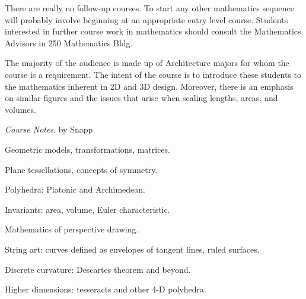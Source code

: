 \documentclass{osucourse}
\begin{document}
\CatalogDescription
\PrerequisitesAndExclusions

\begin{FollowupCourses}
There are really no follow-up courses. To start any other mathematics sequence will probably involve beginning at an appropriate entry level course. Students interested in further course work in mathematics should consult the Mathematics Advisors in 250 Mathematics Bldg.
\end{FollowupCourses}

\begin{Purpose}
The majority of the audience is made up of Architecture majors for whom the course is a requirement. The intent of the course is to introduce these students to the mathematics inherent in 2D and 3D design. Moreover, there is an emphasis on similar figures and the issues that arise when scaling lengths, areas, and volumes.
\end{Purpose}

\begin{Text}
\emph{Course Notes}, by Snapp
\end{Text}

\begin{TopicsList}
\item Geometric models, transformations, matrices.
\item Plane tessellations, concepts of symmetry.
\item Polyhedra: Platonic and Archimedean.
\item Invariants: area, volume, Euler characteristic.
\item Mathematics of perspective drawing.
\item String art: curves defined as envelopes of tangent lines, ruled surfaces.
\item Discrete curvature: Descartes theorem and beyond.
\item Higher dimensions: tesseracts and other 4-D polyhedra.
\end{TopicsList}
\end{document}
